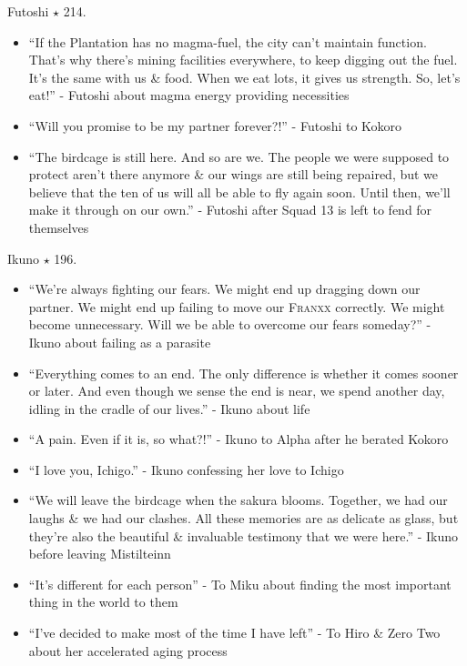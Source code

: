 \documentclass{article}
\begin{document}
\begin{enumerate}
\begin{itemize}
    \end{itemize}
    {\sc Futoshi $\star$ 214.}
    \begin{itemize}
    	\item ``If the Plantation has no magma-fuel, the city can't maintain function. That's why there's mining facilities everywhere, to keep digging out the fuel. It's the same with us \& food. When we eat lots, it gives us strength. So, let's eat!'' - Futoshi about magma energy providing necessities 
    	\item ``Will you promise to be my partner forever?!'' - Futoshi to Kokoro
    	\item ``The birdcage is still here. And so are we. The people we were supposed to protect aren't there anymore \& our wings are still being repaired, but we believe that the ten of us will all be able to fly again soon. Until then, we'll make it through on our own.'' - Futoshi after Squad 13 is left to fend for themselves
    \end{itemize}
    {\sc Ikuno $\star$ 196.}
    \begin{itemize}
    	\item ``We're always fighting our fears. We might end up dragging down our partner. We might end up failing to move our \textsc{Franxx} correctly. We might become unnecessary. Will we be able to overcome our fears someday?'' - Ikuno about failing as a parasite
    	\item ``Everything comes to an end. The only difference is whether it comes sooner or later. And even though we sense the end is near, we spend another day, idling in the cradle of our lives.'' - Ikuno about life
    	\item ``A pain. Even if it is, so what?!'' - Ikuno to Alpha after he berated Kokoro
    	\item ``I love you, Ichigo.'' - Ikuno confessing her love to Ichigo
    	\item ``We will leave the birdcage when the sakura blooms. Together, we had our laughs \& we had our clashes. All these memories are as delicate as glass, but they're also the beautiful \& invaluable testimony that we were here.'' - Ikuno before leaving Mistilteinn
    	\item ``It's different for each person'' - To Miku about finding the most important thing in the world to them
    	\item ``I've decided to make most of the time I have left'' - To Hiro \& Zero Two about her accelerated aging process
    \end{itemize}

\end{enumerate}
\end{document}
